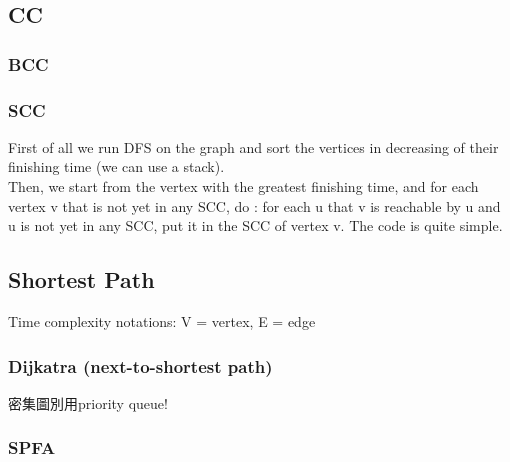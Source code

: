 \documentclass[10pt,oneside]{article}
\begin{document}
\begin{landscape}
\begin{multicols}{2}
\subsection{CC}

\subsubsection{BCC}


\subsubsection{SCC}

First of all we run DFS on the graph and sort the vertices in decreasing of their finishing time (we can use a stack).\\
Then, we start from the vertex with the greatest finishing time, and for each vertex v that is not yet in any SCC, do : for each u that v is reachable by u and u is not yet in any SCC, put it in the SCC of vertex v. The code is quite simple.



\subsection{Shortest Path}

Time complexity notations: V = vertex, E = edge


%

\subsubsection{Dijkatra (next-to-shortest path)}
密集圖別用priority queue!


\subsubsection{SPFA}



\end{multicols}
\end{landscape}
\end{document}
